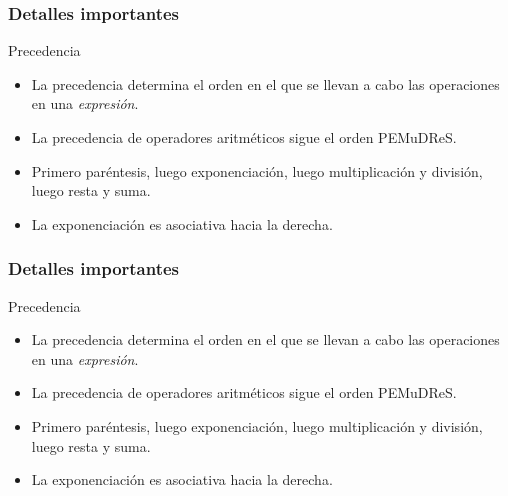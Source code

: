 \documentclass{beamer}
\begin{document}
\begin{frame}[fragile]
\frametitle{Detalles importantes}

\begin{block}{Precedencia}

\begin{itemize}
\item La precedencia determina el orden en el que se llevan a cabo las operaciones en una {\em expresión}.  
\item La precedencia de operadores aritméticos sigue el orden PEMuDReS.
\item Primero paréntesis, luego exponenciación, luego multiplicación y división, luego resta y suma.
\item La exponenciación es asociativa hacia la derecha.
\end{itemize}
\end{block}
\end{frame}

\begin{frame}[fragile]
\frametitle{Detalles importantes}

\begin{block}{Precedencia}

\begin{itemize}
\item La precedencia determina el orden en el que se llevan a cabo las operaciones en una {\em expresión}.  
\item La precedencia de operadores aritméticos sigue el orden PEMuDReS.
\item Primero paréntesis, luego exponenciación, luego multiplicación y división, luego resta y suma.
\item La exponenciación es \alert{asociativa hacia la derecha}.
\end{itemize}
\end{block}
\end{frame}
\end{document}
